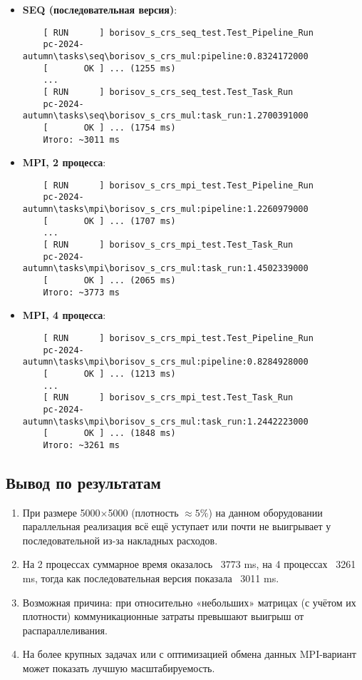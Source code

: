 \documentclass[12pt]{article}
\begin{document}
\begin{itemize}
    \item \textbf{SEQ (последовательная версия)}: 
    \begin{verbatim}
    [ RUN      ] borisov_s_crs_seq_test.Test_Pipeline_Run
    pc-2024-autumn\tasks\seq\borisov_s_crs_mul:pipeline:0.8324172000
    [       OK ] ... (1255 ms)
    ...
    [ RUN      ] borisov_s_crs_seq_test.Test_Task_Run
    pc-2024-autumn\tasks\seq\borisov_s_crs_mul:task_run:1.2700391000
    [       OK ] ... (1754 ms)
    Итого: ~3011 ms
    \end{verbatim}

    \item \textbf{MPI, 2 процесса}:
    \begin{verbatim}
    [ RUN      ] borisov_s_crs_mpi_test.Test_Pipeline_Run
    pc-2024-autumn\tasks\mpi\borisov_s_crs_mul:pipeline:1.2260979000
    [       OK ] ... (1707 ms)
    ...
    [ RUN      ] borisov_s_crs_mpi_test.Test_Task_Run
    pc-2024-autumn\tasks\mpi\borisov_s_crs_mul:task_run:1.4502339000
    [       OK ] ... (2065 ms)
    Итого: ~3773 ms
    \end{verbatim}

    \item \textbf{MPI, 4 процесса}:
    \begin{verbatim}
    [ RUN      ] borisov_s_crs_mpi_test.Test_Pipeline_Run
    pc-2024-autumn\tasks\mpi\borisov_s_crs_mul:pipeline:0.8284928000
    [       OK ] ... (1213 ms)
    ...
    [ RUN      ] borisov_s_crs_mpi_test.Test_Task_Run
    pc-2024-autumn\tasks\mpi\borisov_s_crs_mul:task_run:1.2442223000
    [       OK ] ... (1848 ms)
    Итого: ~3261 ms
    \end{verbatim}
\end{itemize}

\subsection{Вывод по результатам}
\begin{enumerate}
    \item При размере 5000$\times$5000 (плотность $\approx 5\%$) на данном оборудовании параллельная реализация всё ещё уступает или почти не выигрывает у последовательной из-за накладных расходов.
    \item На 2 процессах суммарное время оказалось ~3773 ms, на 4 процессах ~3261 ms, тогда как последовательная версия показала ~3011 ms.
    \item Возможная причина: при относительно «небольших» матрицах (с учётом их плотности) коммуникационные затраты превышают выигрыш от распараллеливания.
    \item На более крупных задачах или с оптимизацией обмена данных MPI-вариант может показать лучшую масштабируемость.
\end{enumerate}
\end{document}
